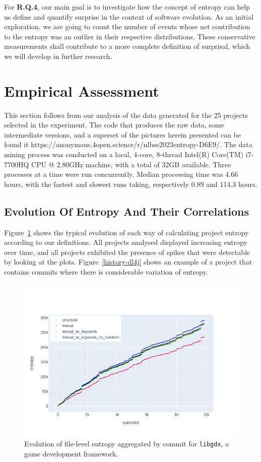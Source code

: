 \documentclass[10pt,conference]{IEEEtran}
\begin{document}
For \textbf{R.Q.4}, our main goal is to investigate how the concept of entropy can help us define and quantify surprise in the context of software evolution. As an initial exploration, we are going to count the number of events whose net contribution to the entropy was an outlier in their respective distributions. These conservative measurements shall contribute to a more complete definition of surprisal, which we will develop in further research.

\section{Empirical Assessment}
This section follows from our analysis of the data generated for the 25 projects selected in the experiment. The code that produces the raw data, some intermediate versions, and a superset of the pictures herein presented can be found it https://anonymous.4open.science/r/nlbse2023entropy-D6E9/.
The data mining process was conducted on a local, 4-core, 8-thread Intel(R) Core(TM) i7-7700HQ CPU @ 2.80GHz machine, with a total of 32GB available. Three processes at a time were run concurrently. Median processing time was 4.66 hours, with the fastest and slowest runs taking, respectively 0.89 and 114.3 hours.

\subsection{Evolution Of Entropy And Their Correlations}

Figure~\ref{history-libgdx} shows the typical evolution of each way of calculating project entropy according to our definitions. All projects analysed displayed increasing entropy over time, and all projects exhibited the presence of spikes that were detectable by looking at the plots. Figure~\ref{history-dl4j} shows an example of a project that contains commits where there is considerable variation of entropy.

\begin{figure}
    \centering
    \includegraphics[width=\linewidth,trim=0 30 60 90,clip]{project-entropy-history/libgdx.png}
    \caption{Evolution of file-level entropy aggregated by commit for \texttt{libgdx}, a game development framework.}
    \label{history-libgdx}
\end{figure}
\end{document}
